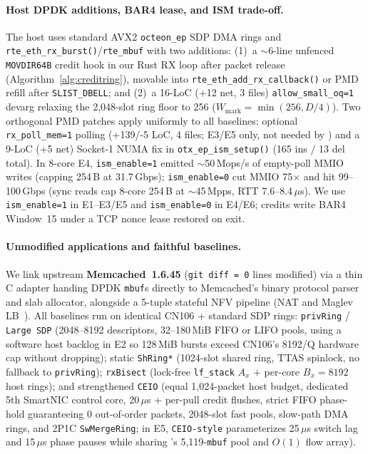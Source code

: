 \paragraph{Host DPDK additions, BAR4 lease, and ISM trade-off.}
The host uses standard AVX2 \texttt{octeon\_ep} SDP DMA rings and
\texttt{rte\_eth\_rx\_burst()}/\texttt{rte\_mbuf} with two \sys{} additions:
(1)~a $\sim$6-line unfenced \texttt{MOVDIR64B} credit hook in our Rust RX loop
after packet release (Algorithm~\ref{alg:creditring}), movable into
\texttt{rte\_eth\_add\_rx\_callback()} or PMD refill after \texttt{SLIST\_DBELL};
and (2)~a 16-LoC (+12 net, 3 files) \texttt{allow\_small\_oq=1} devarg relaxing
the 2,048-slot ring floor to 256 ($W_{\text{mark}}=\min(256,D/4)$). Two
orthogonal PMD patches apply uniformly to all baselines: optional
\texttt{rx\_poll\_mem=1} polling (+139/-5 LoC, 4 files; E3/E5 only, not needed
by \sys{}) and a 9-LoC (+5 net) Socket-1 NUMA fix in \texttt{otx\_ep\_ism\_setup()}
(165 ins / 13 del total). In 8-core E4, \texttt{ism\_enable=1} emitted
$\sim$50\,Mops/s of empty-poll MMIO writes (capping 254\,B at 31.7\,Gbps);
\texttt{ism\_enable=0} cut MMIO 75$\times$ and hit 99--100\,Gbps (sync reads
cap 8-core 254\,B at $\sim$45\,Mpps, RTT 7.6--8.4\,$\mu$s). We use
\texttt{ism\_enable=1} in E1--E3/E5 and \texttt{ism\_enable=0} in E4/E6;
credits write BAR4 Window~15 under a TCP nonce lease restored on exit.

\paragraph{Unmodified applications and faithful baselines.}
We link upstream \textbf{Memcached~1.6.45} (\texttt{git diff = 0} lines
modified) via a thin C adapter handing DPDK \texttt{mbuf}s directly to
Memcached's binary protocol parser and slab allocator, alongside a 5-tuple
stateful NFV pipeline (NAT and Maglev LB~\cite{eisenbud2016maglev}). All
baselines run on identical CN106 + standard SDP rings: \texttt{privRing} /
\texttt{Large SDP} (2048--8192 descriptors, 32--180\,MiB FIFO or LIFO pools,
using a software host backlog in E2 so 128\,MiB bursts exceed CN106's 8192/Q
hardware cap without dropping); static \texttt{ShRing*} (1024-slot shared ring,
TTAS spinlock, no fallback to \texttt{privRing}); \texttt{rxBisect} (lock-free
\texttt{lf\_stack} $A_x$ + per-core $B_x = 8192$ host rings); and strengthened
\texttt{CEIO} (equal 1,024-packet host budget, dedicated 5th SmartNIC control
core, 20\,$\mu$s + per-pull credit flushes, strict FIFO phase-hold guaranteeing
0 out-of-order packets, 2048-slot fast pools, slow-path DMA rings, and 2P1C
\texttt{SwMergeRing}; in E5, \texttt{CEIO-style} parameterizes 25\,$\mu$s
switch lag and 15\,$\mu$s phase pauses while sharing \sys{}'s 5,119-\texttt{mbuf}
pool and $O(1)$ flow array).

